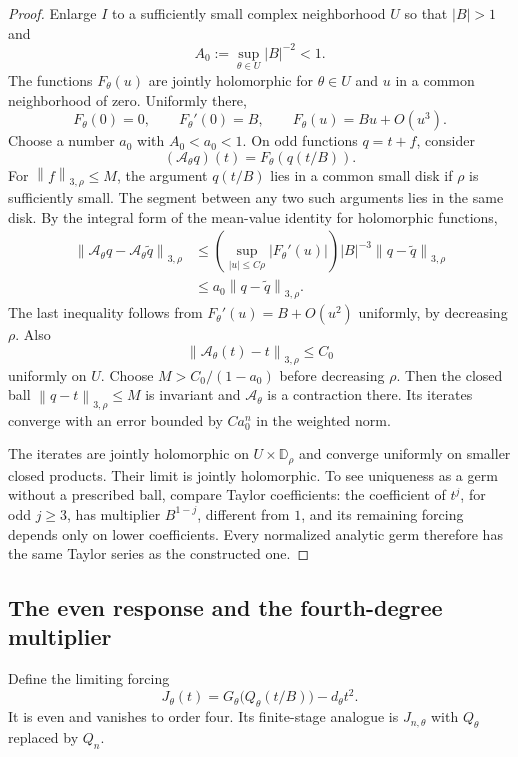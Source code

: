 \documentclass[11pt]{article}
\theoremstyle{definition}
\newcommand{\norm}[1]{\left\lVert #1\right\rVert}
\newcommand{\Disk}{\mathbb D}
\begin{document}
\begin{proof}
Enlarge $I$ to a sufficiently small complex neighborhood $U$ so that
$|B|>1$ and
\[
 A_0:=\sup_{\theta\in U}|B|^{-2}<1.
\]
The functions $F_\theta(u)$ are jointly holomorphic for $\theta\in U$
and $u$ in a common neighborhood of zero. Uniformly there,
\[
 F_\theta(0)=0,\qquad F_\theta'(0)=B,
 \qquad F_\theta(u)=Bu+O(u^3).
\]
Choose a number $a_0$ with $A_0<a_0<1$. On odd functions $q=t+f$,
consider
\[
             (\mathcal A_\theta q)(t)=F_\theta(q(t/B)).
\]
For $\norm{f}_{3,\rho}\leq M$, the argument $q(t/B)$ lies in a
common small disk if $\rho$ is sufficiently small. The segment between
any two such arguments lies in the same disk. By the integral form of
the mean-value identity for holomorphic functions,
\begin{align*}
 \norm{\mathcal A_\theta q-\mathcal A_\theta\widetilde q}_{3,\rho}
 &\leq \left(\sup_{|u|\leq C\rho}|F_\theta'(u)|\right)
            |B|^{-3}\norm{q-\widetilde q}_{3,\rho}\\
 &\leq a_0\norm{q-\widetilde q}_{3,\rho}.
\end{align*}
The last inequality follows from $F_\theta'(u)=B+O(u^2)$ uniformly,
by decreasing $\rho$. Also
\[
       \norm{\mathcal A_\theta(t)-t}_{3,\rho}\leq C_0
\]
uniformly on $U$. Choose $M>C_0/(1-a_0)$ before decreasing $\rho$.
Then the closed ball $\norm{q-t}_{3,\rho}\leq M$ is invariant and
$\mathcal A_\theta$ is a contraction there. Its iterates converge with
an error bounded by $Ca_0^n$ in the weighted norm.

The iterates are jointly holomorphic on $U\times\Disk_\rho$ and
converge uniformly on smaller closed products. Their limit is jointly
holomorphic. To see uniqueness as a germ without a prescribed ball,
compare Taylor coefficients: the coefficient of $t^j$, for odd $j\geq3$,
has multiplier $B^{1-j}$, different from $1$, and its remaining forcing
depends only on lower coefficients. Every normalized analytic germ
therefore has the same Taylor series as the constructed one.
\end{proof}

\subsection{The even response and the fourth-degree multiplier}

Define the limiting forcing
\begin{equation}\label{eq:J}
 J_\theta(t)=G_\theta\bigl(Q_\theta(t/B)\bigr)-d_\theta t^2.
\end{equation}
It is even and vanishes to order four. Its finite-stage analogue is
$J_{n,\theta}$ with $Q_\theta$ replaced by $Q_n$.
\end{document}

